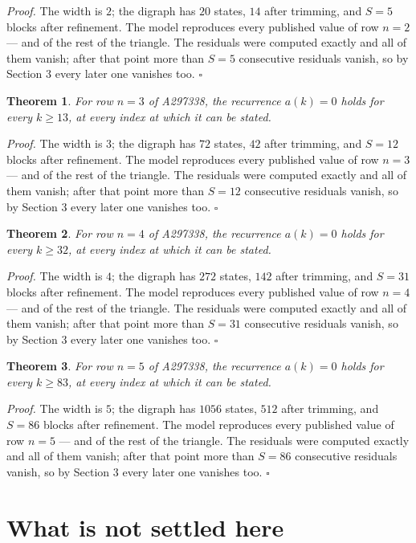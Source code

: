 \documentclass[11pt]{article}
\newtheorem{theorem}{Theorem}
\theoremstyle{definition}
\begin{document}
{\itshape Proof.} The width is $2$; the digraph has $20$ states, $14$ after trimming, and $S = 5$ blocks after refinement. The model reproduces every published value of row $n = 2$ --- and of the rest of the triangle. The residuals were computed exactly and all of them vanish; after that point more than $S = 5$ consecutive residuals vanish, so by Section 3 every later one vanishes too. $\square$

\begin{theorem} For row $n = 3$ of A297338, the recurrence $a(k) = 0$ holds for every $k \ge 13$, at every index at which it can be stated.\end{theorem}

{\itshape Proof.} The width is $3$; the digraph has $72$ states, $42$ after trimming, and $S = 12$ blocks after refinement. The model reproduces every published value of row $n = 3$ --- and of the rest of the triangle. The residuals were computed exactly and all of them vanish; after that point more than $S = 12$ consecutive residuals vanish, so by Section 3 every later one vanishes too. $\square$

\begin{theorem} For row $n = 4$ of A297338, the recurrence $a(k) = 0$ holds for every $k \ge 32$, at every index at which it can be stated.\end{theorem}

{\itshape Proof.} The width is $4$; the digraph has $272$ states, $142$ after trimming, and $S = 31$ blocks after refinement. The model reproduces every published value of row $n = 4$ --- and of the rest of the triangle. The residuals were computed exactly and all of them vanish; after that point more than $S = 31$ consecutive residuals vanish, so by Section 3 every later one vanishes too. $\square$

\begin{theorem} For row $n = 5$ of A297338, the recurrence $a(k) = 0$ holds for every $k \ge 83$, at every index at which it can be stated.\end{theorem}

{\itshape Proof.} The width is $5$; the digraph has $1056$ states, $512$ after trimming, and $S = 86$ blocks after refinement. The model reproduces every published value of row $n = 5$ --- and of the rest of the triangle. The residuals were computed exactly and all of them vanish; after that point more than $S = 86$ consecutive residuals vanish, so by Section 3 every later one vanishes too. $\square$

\section{What is not settled here}
\end{document}
